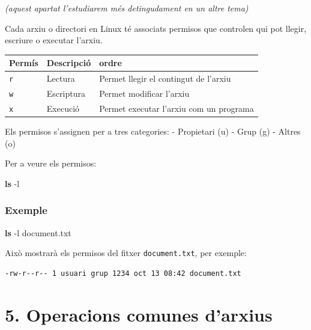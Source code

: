 \documentclass[
  12 pt,
  a4paper,
]{article}
\newenvironment{Shaded}{\begin{snugshade}}{\end{snugshade}}
\newcommand{\AttributeTok}[1]{\textcolor[rgb]{0.13,0.29,0.53}{#1}}
\newcommand{\FunctionTok}[1]{\textcolor[rgb]{0.13,0.29,0.53}{\textbf{#1}}}
\newcommand{\NormalTok}[1]{#1}
\begin{document}
\emph{(aquest apartat l'estudiarem més detingudament en un altre tema)}

Cada arxiu o directori en Linux té associats permisos que controlen qui
pot llegir, escriure o executar l'arxiu.

\begin{longtable}[]{@{}lll@{}}
\toprule\noalign{}
Permís & Descripció & ordre \\
\midrule\noalign{}
\endhead
\bottomrule\noalign{}
\endlastfoot
\texttt{r} & Lectura & Permet llegir el contingut de l'arxiu \\
\texttt{w} & Escriptura & Permet modificar l'arxiu \\
\texttt{x} & Execució & Permet executar l'arxiu com un programa \\
\end{longtable}

Els permisos s'assignen per a tres categories: - Propietari (u) - Grup
(g) - Altres (o)

Per a veure els permisos:

\begin{Shaded}
\begin{Highlighting}[]
\FunctionTok{ls} \AttributeTok{{-}l}
\end{Highlighting}
\end{Shaded}

\subsubsection{Exemple}\label{exemple-3}

\begin{Shaded}
\begin{Highlighting}[]
\FunctionTok{ls} \AttributeTok{{-}l}\NormalTok{ document.txt}
\end{Highlighting}
\end{Shaded}

Això mostrarà els permisos del fitxer \texttt{document.txt}, per
exemple:

\begin{verbatim}
-rw-r--r-- 1 usuari grup 1234 oct 13 08:42 document.txt
\end{verbatim}

\section{5. Operacions comunes
d'arxius}\label{operacions-comunes-darxius}
\end{document}
